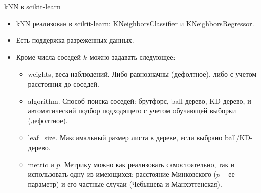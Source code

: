 \documentclass{beamer}
\begin{document}
\begin{frame}{kNN в scikit-learn}
    \small

    \begin{itemize}
        \item kNN реализован в scikit-learn: KNeighborsClassifier и KNeighborsRegressor. \item Есть поддержка разреженных данных. 
        \item Кроме числа соседей $k$ можно задавать следующее:
        \begin{itemize}
            \item weights, веса наблюдений. Либо равнозначны (дефолтное), либо с учетом расстояния до соседей.
            \item algorithm. Способ поиска соседей: брутфорс, ball-дерево, KD-дерево, и автоматический подбор подходящего с учетом обучающей выборки (дефолтное).
            \item leaf\_size. Максимальный размер листа в дереве, если выбрано ball/KD-дерево.
            \item metric и $p$. Метрику можно как реализовать самостоятельно, так и использовать одну из имеющихся: расстояние Минковского ($p$ -- ее параметр) и его частные случаи (Чебышева и Манхэттенская).
        \end{itemize}
    \end{itemize}
\end{frame}
\end{document}
